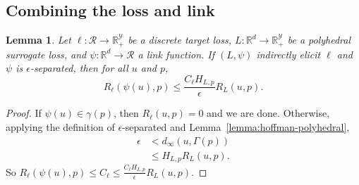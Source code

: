 \documentclass{article}
\newtheorem{lemma}{Lemma}
\theoremstyle{definition}\newtheorem{definition}{Definition}
\theoremstyle{definition}\newtheorem{assumption}{Assumption}
\newcommand{\reals}{\mathbb{R}}
\newcommand{\R}{\mathcal{R}}
\newcommand{\Y}{\mathcal{Y}}
\begin{document}
\subsection{Combining the loss and link}
\begin{lemma}\label{lemma:separated-constant-p}
  Let $\ell: \R \to \reals_+^{\Y}$ be a discrete target loss, $L: \reals^d \to \reals_+^{\Y}$ be a polyhedral surrogate loss, and $\psi: \reals^d \to \R$ a link function.
  If $(L,\psi)$ indirectly elicit $\ell$ and $\psi$ is $\epsilon$-separated, then for all $u$ and $p$,
    \[ R_{\ell}(\psi(u),p) \leq \frac{C_{\ell} H_{L,p}}{\epsilon} R_L(u,p) . \]
\end{lemma}
\begin{proof}
  If $\psi(u) \in \gamma(p)$, then $R_{\ell}(u,p) = 0$ and we are done.
  Otherwise, applying the definition of $\epsilon$-separated and Lemma~\ref{lemma:hoffman-polyhedral},
  \begin{align*}
    \epsilon &<    d_{\infty}(u,\Gamma(p))  \\
             &\leq H_{L,p} R_L(u,p) .
  \end{align*}
  So $R_{\ell}(\psi(u),p) \leq C_{\ell} \leq \frac{C_{\ell} H_{L,p}}{\epsilon} R_L(u,p)$.
\end{proof}
\end{document}
